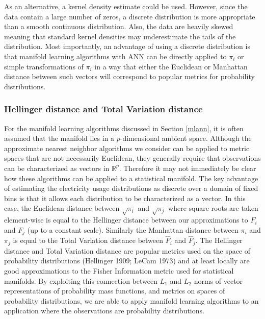 \documentclass[12pt]{article}
\begin{document}
As an alternative, a kernel density estimate could be used. However, since the data contain a large number of zeros, a discrete distribution is more appropriate than a smooth continuous distribution. Also, the data are heavily skewed meaning that standard kernel densities may underestimate the tails of the distribution. Most importantly, an advantage of using a discrete distribution is that manifold learning algorithms with ANN can be directly applied to \(\pi_i\) or simple transformations of \(\pi_i\) in a way that either the Euclidean or Manhattan distance between such vectors will correspond to popular metrics for probability distributions.

\hypertarget{hellinger-distance-and-total-variation-distance}{%
\subsubsection*{Hellinger distance and Total Variation distance}\label{hellinger-distance-and-total-variation-distance}}

For the manifold learning algorithms discussed in Section \ref{mlann}, it is often assumed that the manifold lies in a \(p\)-dimensional ambient space. Although the approximate nearest neighbor algorithms we consider can be applied to metric spaces that are not necessarily Euclidean, they generally require that observations can be characterized as vectors in \(\mathbb{R}^p\). Therefore it may not immediately be clear how these algorithms can be applied to a statistical manifold. The key advantage of estimating the electricity usage distributions as discrete over a domain of fixed bins is that it allows each distribution to be characterized as a vector. In this case, the Euclidean distance between \(\sqrt{\pi_{i}}\) and \(\sqrt{\pi_{j}}\) where square roots are taken element-wise is equal to the Hellinger distance between our approximations to \(F_{i}\) and \(F_{j}\) (up to a constant scale). Similarly the Manhattan distance between \(\pi_{i}\) and \(\pi_{j}\) is equal to the Total Variation distance between \(\hat{F}_{i}\) and \(\hat{F}_{j}\). The Hellinger distance and Total Variation distance are popular metrics used on the space of probability distributions (Hellinger 1909; LeCam 1973) and at least locally are good approximations to the Fisher Information metric used for statistical manifolds. By exploiting this connection between \(L_1\) and \(L_2\) norms of vector representations of probability mass functions, and metrics on spaces of probability distributions, we are able to apply manifold learning algorithms to an application where the observations are probability distributions.
\end{document}
